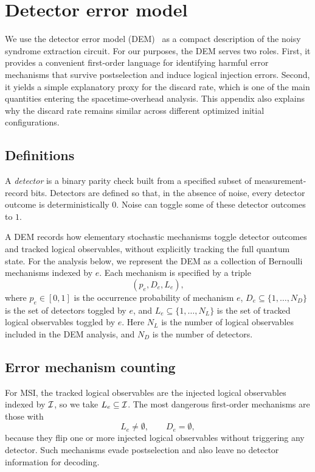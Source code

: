 \section{Detector error model}
\label{sec:detector-error-model}

We use the detector error model (DEM)~\cite{gidney_stim_2021} as a compact description of the noisy syndrome extraction circuit.
For our purposes, the DEM serves two roles.
First, it provides a convenient first-order language for identifying harmful error mechanisms that survive postselection and induce logical injection errors.
Second, it yields a simple explanatory proxy for the discard rate, which is one of the main quantities entering the spacetime-overhead analysis.
This appendix also explains why the discard rate remains similar across different optimized initial configurations.

\subsection{Definitions}

A \emph{detector} is a binary parity check built from a specified subset of measurement-record bits.
Detectors are defined so that, in the absence of noise, every detector outcome is deterministically $0$.
Noise can toggle some of these detector outcomes to $1$.

A DEM records how elementary stochastic mechanisms toggle detector outcomes and tracked logical observables, without explicitly tracking the full quantum state.
For the analysis below, we represent the DEM as a collection of Bernoulli mechanisms indexed by $e$.
Each mechanism is specified by a triple
\begin{equation}
(p_e, D_e, L_e),
\label{eq:dem_mechanism_triple}
\end{equation}
where $p_e\in[0,1]$ is the occurrence probability of mechanism $e$, $D_e\subseteq\{1,\dots,N_D\}$ is the set of detectors toggled by $e$, and $L_e\subseteq\{1,\dots,N_L\}$ is the set of tracked logical observables toggled by $e$.
Here $N_L$ is the number of logical observables included in the DEM analysis, and $N_D$ is the number of detectors.

\subsection{Error mechanism counting}

For MSI, the tracked logical observables are the injected logical observables indexed by $\mathcal{I}$, so we take $L_e\subseteq \mathcal{I}$.
The most dangerous first-order mechanisms are those with
\begin{equation}
L_e \neq \emptyset,
\qquad
D_e = \emptyset,
\end{equation}
because they flip one or more injected logical observables without triggering any detector.
Such mechanisms evade postselection and also leave no detector information for decoding.

